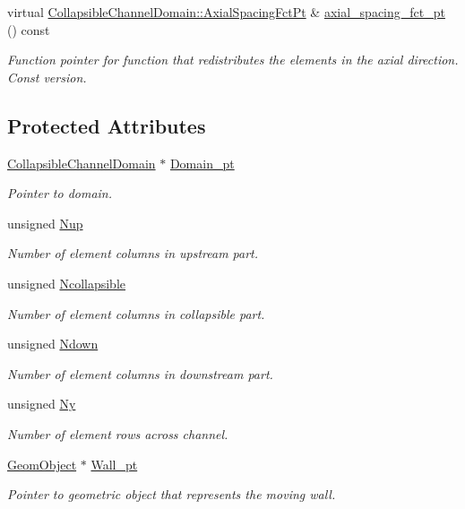 \begin{DoxyCompactItemize}
virtual \hyperlink{classoomph_1_1CollapsibleChannelDomain_a317472dab112beac771ecf6442a465f5}{Collapsible\+Channel\+Domain\+::\+Axial\+Spacing\+Fct\+Pt} \& \hyperlink{classoomph_1_1CollapsibleChannelMesh_a7a615ef1fcb4cb422e3c78267818ceec}{axial\+\_\+spacing\+\_\+fct\+\_\+pt} () const
\begin{DoxyCompactList}\small\item\em Function pointer for function that redistributes the elements in the axial direction. Const version. \end{DoxyCompactList}\end{DoxyCompactItemize}
\subsection*{Protected Attributes}
\begin{DoxyCompactItemize}
\item 
\hyperlink{classoomph_1_1CollapsibleChannelDomain}{Collapsible\+Channel\+Domain} $\ast$ \hyperlink{classoomph_1_1CollapsibleChannelMesh_ae7b9e4a110dded8399a6daf6f48a9e23}{Domain\+\_\+pt}
\begin{DoxyCompactList}\small\item\em Pointer to domain. \end{DoxyCompactList}\item 
unsigned \hyperlink{classoomph_1_1CollapsibleChannelMesh_aafd1c6d21bb891f1188ba6eed1705a45}{Nup}
\begin{DoxyCompactList}\small\item\em Number of element columns in upstream part. \end{DoxyCompactList}\item 
unsigned \hyperlink{classoomph_1_1CollapsibleChannelMesh_aa59ff7af47247b2e17b13c45f83fcf86}{Ncollapsible}
\begin{DoxyCompactList}\small\item\em Number of element columns in collapsible part. \end{DoxyCompactList}\item 
unsigned \hyperlink{classoomph_1_1CollapsibleChannelMesh_acd1b5ea7597a079b4321d3658f2e03f4}{Ndown}
\begin{DoxyCompactList}\small\item\em Number of element columns in downstream part. \end{DoxyCompactList}\item 
unsigned \hyperlink{classoomph_1_1CollapsibleChannelMesh_afa8d1dceef1cafeb166794d9275a30a3}{Ny}
\begin{DoxyCompactList}\small\item\em Number of element rows across channel. \end{DoxyCompactList}\item 
\hyperlink{classoomph_1_1GeomObject}{Geom\+Object} $\ast$ \hyperlink{classoomph_1_1CollapsibleChannelMesh_a2457ac1492c962b0a3d962b13b51ea6e}{Wall\+\_\+pt}
\begin{DoxyCompactList}\small\item\em Pointer to geometric object that represents the moving wall. \end{DoxyCompactList}\end{DoxyCompactItemize}
